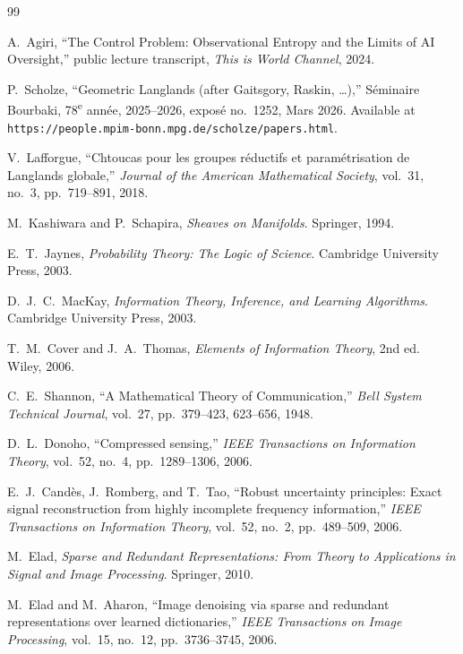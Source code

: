 \documentclass[12pt]{article}
\theoremstyle{plain}
\theoremstyle{definition}
\theoremstyle{remark}
\begin{document}
\begin{thebibliography}{99}

A.~Agiri,
``The Control Problem: Observational Entropy and the Limits of AI Oversight,''
public lecture transcript, \textit{This is World Channel}, 2024.

P.~Scholze,
``Geometric Langlands (after Gaitsgory, Raskin, \ldots),''
S\'eminaire Bourbaki, 78\textsuperscript{e} ann\'ee, 2025--2026, expos\'e no.~1252, Mars 2026.
Available at \texttt{https://people.mpim-bonn.mpg.de/scholze/papers.html}.

V.~Lafforgue,
``Chtoucas pour les groupes r\'eductifs et param\'etrisation de Langlands globale,''
\textit{Journal of the American Mathematical Society}, vol.~31, no.~3, pp.~719--891, 2018.

M.~Kashiwara and P.~Schapira,
\textit{Sheaves on Manifolds}.
Springer, 1994.

E.~T.~Jaynes,
\textit{Probability Theory: The Logic of Science}.
Cambridge University Press, 2003.

D.~J.~C.~MacKay,
\textit{Information Theory, Inference, and Learning Algorithms}.
Cambridge University Press, 2003.

T.~M.~Cover and J.~A.~Thomas,
\textit{Elements of Information Theory}, 2nd ed.
Wiley, 2006.

C.~E.~Shannon,
``A Mathematical Theory of Communication,''
\textit{Bell System Technical Journal}, vol.~27, pp.~379--423, 623--656, 1948.

D.~L.~Donoho,
``Compressed sensing,''
\textit{IEEE Transactions on Information Theory}, vol.~52, no.~4, pp.~1289--1306, 2006.

E.~J.~Candès, J.~Romberg, and T.~Tao,
``Robust uncertainty principles: Exact signal reconstruction from highly incomplete frequency information,''
\textit{IEEE Transactions on Information Theory}, vol.~52, no.~2, pp.~489--509, 2006.

M.~Elad,
\textit{Sparse and Redundant Representations: From Theory to Applications in Signal and Image Processing}.
Springer, 2010.

M.~Elad and M.~Aharon,
``Image denoising via sparse and redundant representations over learned dictionaries,''
\textit{IEEE Transactions on Image Processing}, vol.~15, no.~12, pp.~3736--3745, 2006.


\end{thebibliography}
\end{document}
